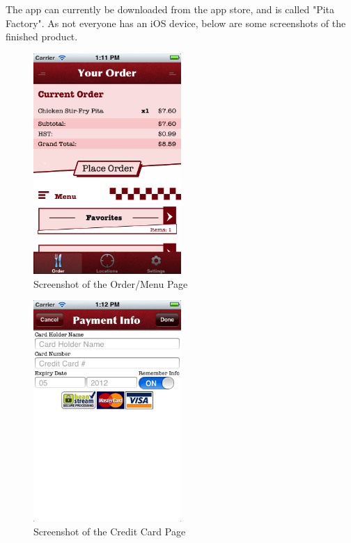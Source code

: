 \documentclass[se]{uw-wkrpt}
\begin{document}
The app can currently be downloaded from the app store, and is called "Pita Factory". As
not everyone has an iOS device, below are some screenshots of the finished product.

\begin{figure}[h!]
  \caption{Screenshot of the Order/Menu Page}
  \centering
    \includegraphics[width=0.5\textwidth]{orderMenuPage}
\end{figure}

\begin{figure}[h!]
  \caption{Screenshot of the Credit Card Page}
  \centering
    \includegraphics[width=0.5\textwidth]{creditCardPage}
\end{figure}
\end{document}
